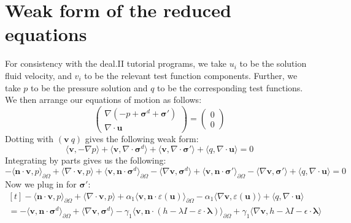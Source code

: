 \documentclass[reqno]{article}
\begin{document}
  \section{Weak form of the reduced equations}
  For consistency with the deal.II tutorial programs, we take $u_i$ to be the
  solution fluid velocity, and $v_i$ to be the relevant test function
  components.
  Further, we take $p$ to be the pressure solution and $q$ to be the
  corresponding test functions.
  We then arrange our equations of motion as follows:
  \begin{equation}
    \begin{pmatrix}
      \nabla \left(
        -p + \boldsymbol\sigma^d + \boldsymbol\sigma'
      \right) \\
      \nabla \cdot \mathbf{u}
    \end{pmatrix}
    =
    \begin{pmatrix}
      0 \\
      0
    \end{pmatrix}
  \end{equation}
  Dotting with $(\mathbf{v} \: q)$ gives the following weak form:
  \begin{equation}
    \langle \mathbf{v}, -\nabla p \rangle
    + \langle \mathbf{v}, \nabla \cdot \boldsymbol\sigma^d \rangle
    + \langle \mathbf{v}, \nabla \cdot \boldsymbol\sigma' \rangle
    + \langle q, \nabla \cdot \mathbf{u} \rangle
    =
    0
  \end{equation}
  Integrating by parts gives us the following:
  \begin{equation}
    -\langle \mathbf{n} \cdot \mathbf{v}, p \rangle_{\partial \Omega}
    + \langle \nabla \cdot \mathbf{v}, p \rangle
    + \langle \mathbf{v}, \mathbf{n} \cdot \boldsymbol\sigma^d \rangle_{\partial \Omega}
    - \langle \nabla \mathbf{v}, \boldsymbol\sigma^d \rangle
    + \langle \mathbf{v}, \mathbf{n} \cdot \boldsymbol\sigma' \rangle_{\partial \Omega}
    - \langle \nabla \mathbf{v}, \boldsymbol\sigma' \rangle
    + \langle q, \nabla \cdot \mathbf{u} \rangle
    =
    0
  \end{equation}
  Now we plug in for $\mathbf{\sigma}'$:
  \begin{equation}
    \begin{multlined}[t]
      -\langle \mathbf{n} \cdot \mathbf{v}, p \rangle_{\partial \Omega}
      + \langle \nabla \cdot \mathbf{v}, p \rangle
      + \alpha_1 \langle \mathbf{v}, \mathbf{n} \cdot \varepsilon(\mathbf{u}) \rangle_{\partial \Omega}
      - \alpha_1 \langle \nabla \mathbf{v}, \varepsilon(\mathbf{u}) \rangle 
      + \langle q, \nabla \cdot \mathbf{u} \rangle \\
      =
      - \langle \mathbf{v}, \mathbf{n} \cdot \boldsymbol\sigma^d \rangle_{\partial \Omega}
      + \langle \nabla \mathbf{v}, \boldsymbol\sigma^d \rangle
      - \gamma_1 \langle \mathbf{v}, \mathbf{n} \cdot (h - \lambda I - \varepsilon \cdot \mathbf{\lambda}) \rangle_{\partial \Omega}
      + \gamma_1 \langle \nabla\mathbf{v}, h - \lambda I - \epsilon \cdot \boldsymbol\lambda \rangle
    \end{multlined}
  \end{equation}
\end{document}
